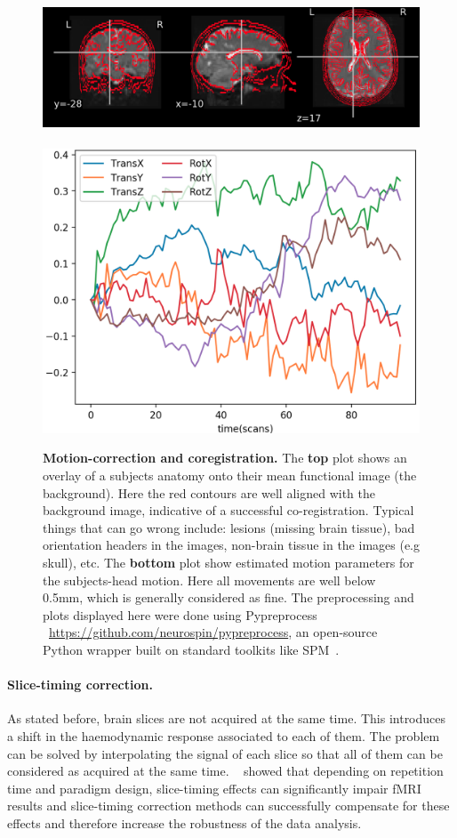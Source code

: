 \begin{figure}[!htpb]
  \includegraphics[width=1\linewidth]{figures/coreg.png}\\\\
  \includegraphics[width=1\linewidth]{figures/mc.png}
  \caption{\textbf{Motion-correction and coregistration.} The \textbf{top} plot shows an overlay of a subjects anatomy onto their mean functional image (the background). Here the red contours are well aligned with the background image, indicative of a successful co-registration. Typical things that can go wrong include: lesions (missing brain tissue), bad orientation headers in the images, non-brain tissue in the images (e.g skull), etc. The \textbf{bottom} plot show estimated motion parameters for the subjects-head motion. Here all movements are well below 0.5mm, which is generally considered as fine. The preprocessing and plots displayed here were done using Pypreprocess ~\url{https://github.com/neurospin/pypreprocess}, an open-source Python wrapper built on standard toolkits like SPM~\citep{friston1994statistical}.}
\end{figure}

\paragraph{Slice-timing correction.}
As stated before, brain slices are not acquired
at the same time. This introduces a shift in the haemodynamic response
associated to each of them. The problem can be solved by interpolating the
signal of each slice so that all of them can be considered as acquired at the
same time. ~\citep{sladky2011} showed that
depending on repetition time and paradigm design, slice-timing effects can significantly impair fMRI results and slice-timing correction methods can successfully compensate for these effects and therefore increase the robustness of the data analysis.

